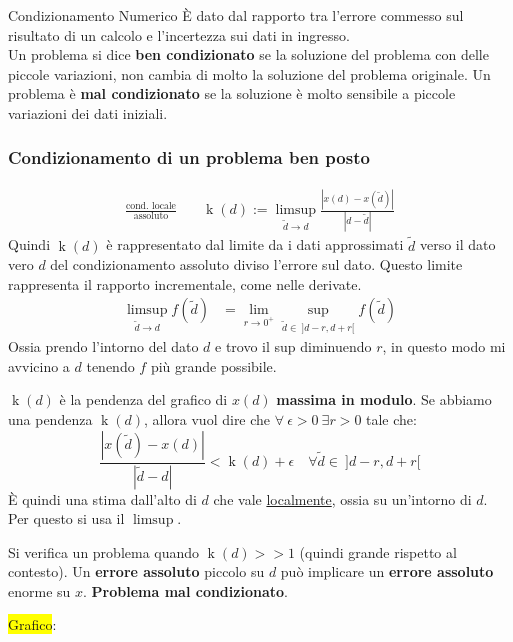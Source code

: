 \documentclass{article}
\begin{document}
\begin{defi}{Condizionamento Numerico}{}
    È dato dal rapporto tra l'errore commesso sul risultato di un calcolo e l'incertezza sui dati in ingresso.\\
    Un problema si dice \textbf{ben condizionato} se la soluzione del problema con delle piccole variazioni, non cambia
    di molto la soluzione del problema originale. Un problema è \textbf{mal condizionato} se la soluzione è molto sensibile
    a piccole variazioni dei dati iniziali.
\end{defi}

\subsubsection{Condizionamento di un problema ben posto}
\begin{align*}
    \frac{\text{cond. locale}}{\text{assoluto}}\quad & \operatorname{k}(d):=\limsup_{\widetilde{d}\to d}\frac{\left|x(d)-x(\widetilde{d})\right|}{\left|d-\widetilde{d}\right|}
\end{align*}
Quindi $\operatorname{k}(d)$ è rappresentato dal limite da i dati approssimati $\widetilde{d}$ verso il dato vero $d$ del condizionamento assoluto diviso l'errore sul dato.
Questo limite rappresenta il rapporto incrementale, come nelle derivate.
\begin{align*}
    \limsup_{\widetilde{d}\to d}f(\widetilde{d}) & =\lim_{r\to 0^+}\sup_{\widetilde{d}\in\ ]d-r,d+r[}f(\widetilde{d})
\end{align*}
Ossia prendo l'intorno del dato $d$ e trovo il sup diminuendo $r$, in questo modo mi avvicino a $d$ tenendo $f$ più grande possibile.

$\operatorname{k}(d)$ è la pendenza del grafico di $x(d)$ \textbf{massima in modulo}. Se abbiamo una pendenza $\operatorname{k}(d)$, allora
vuol dire che  $\forall\ \epsilon>0\ \exists r>0$ tale che:$$\frac{\left|x(\widetilde{d})-x(d)\right|}{|\widetilde{d}-d|}<\operatorname{k}(d)+\epsilon\quad \forall\widetilde{d}\in\ ]d-r,d+r[$$
È quindi una stima dall'alto di $d$ che vale \underline{localmente}, ossia su un'intorno di $d$. Per questo si usa il $\limsup$.

Si verifica un problema quando $\operatorname{k}(d)>>1$ (quindi grande rispetto al contesto). Un \textbf{errore assoluto} piccolo su $d$ può
implicare un \textbf{errore assoluto} enorme su $x$. \textbf{Problema mal condizionato}.

\colorbox{yellow}{Grafico}:
\end{document}
